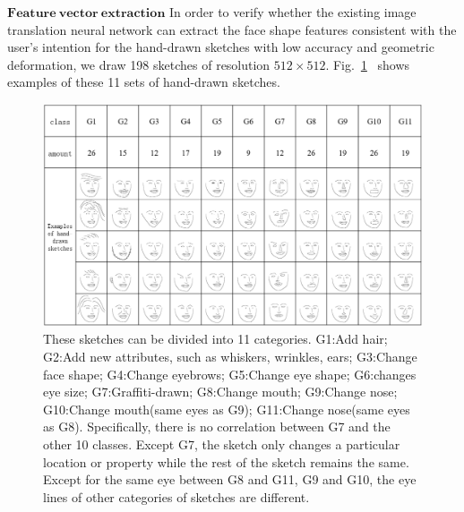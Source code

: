 \documentclass[10pt,twocolumn,letterpaper]{article}
\begin{document}
\noindent
$\mathbf{Feature ~vector ~extraction}$ In order to verify whether the existing image translation neural network can extract the face shape features consistent with the user's intention for the hand-drawn sketches with low accuracy and geometric deformation, we draw 198 sketches of resolution $512\times512$. Fig.~\ref{fig:hand_drawn_contours}~ shows examples of these 11 sets of hand-drawn sketches.  
\begin{figure}[htbp]
	\centering
	\includegraphics[width=0.9 \textwidth]{hand_drawn_sketches.png}
	\caption{These sketches can be divided into 11 categories. G1:Add hair; G2:Add new attributes, such as whiskers, wrinkles, ears; G3:Change face shape; G4:Change eyebrows; G5:Change eye shape; G6:changes eye size; G7:Graffiti-drawn; G8:Change mouth; G9:Change nose; G10:Change mouth(same eyes as G9); G11:Change nose(same eyes as G8). Specifically, there is no correlation between G7 and the other 10 classes. Except G7, the sketch only changes a particular location or property while the rest of the sketch remains the same. Except for the same eye between G8 and G11, G9 and G10, the eye lines of other categories of sketches are different.}
	\label{fig:hand_drawn_contours}
\end{figure}
\end{document}
